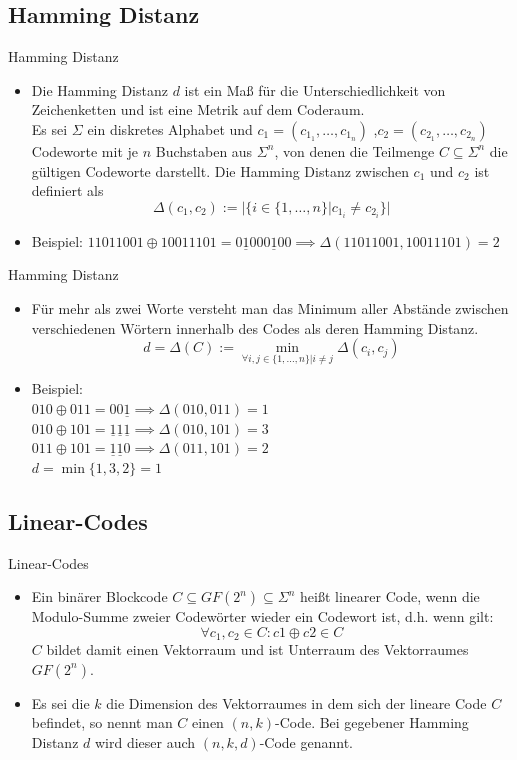 \documentclass[11pt%
,aspectratio=169%
]{beamer}
\begin{document}
\subsection{Hamming Distanz}

\begin{frame}{Hamming Distanz}
	\begin{itemize}
		\item Die Hamming Distanz $d$ ist ein Maß für die Unterschiedlichkeit von Zeichenketten und ist eine Metrik auf dem Coderaum.
		\\Es sei $\Sigma$ ein diskretes Alphabet und $c_1=(c_{1_1},\ldots,c_{1_n})$ ,$c_2=(c_{2_1},\ldots,c_{2_n})$ Codeworte mit je $n$ Buchstaben aus $\Sigma^n$, von denen die Teilmenge  $C\subseteq\Sigma^n$ die gültigen Codeworte darstellt. 
		Die Hamming Distanz zwischen $c_1$ und $c_2$ ist definiert als \[\Delta(c_1,c_2):=|\{i \in \{1,\ldots,n\}| c_{1_i}\neq c_{2_i} \}|\]
		\item Beispiel:
					$ 11011001\oplus 10011101 = 0\underline{1}000\underline{1}00 
					\implies \Delta(11011001,10011101) = 2
					$
	\end{itemize}
\end{frame}

\begin{frame}{Hamming Distanz}
	\begin{itemize}
	
		\item Für mehr als zwei Worte versteht man das Minimum aller Abstände zwischen verschiedenen Wörtern innerhalb des Codes als deren Hamming Distanz.
		\[d=\Delta(C):= \min_{\forall i,j \in \{1,\ldots,n\}|i\neq j}\Delta(c_i,c_j)\]
		\item Beispiel:\\
		$ 010\oplus 011 = 00\underline{1}\implies \Delta(010,011) = 1	$\\$ 010\oplus 101 = \underline{1}\underline{1}\underline{1}\implies \Delta(010,101) = 3$\\ $011\oplus 101 = \underline{1}\underline{1}0
		\implies \Delta(011,101) = 2 $\\$d=\min\{1,3,2\}=1$
	\end{itemize}
\end{frame}

\subsection{Linear-Codes}
\begin{frame}{Linear-Codes}
	\begin{itemize}
		\item Ein binärer Blockcode $C\subseteq GF(2^n) \subseteq \Sigma^n$ heißt linearer Code, wenn die Modulo-Summe zweier Codewörter wieder ein Codewort ist, d.h. wenn gilt:
			\[\forall c_1,c_2 \in C \colon c1\oplus c2 \in C \]
			$C$ bildet damit einen Vektorraum und ist Unterraum des Vektorraumes $GF(2^n)$.
		\item Es sei die $k$ die Dimension des Vektorraumes in dem sich der lineare Code $C$ befindet, so nennt man $C$ einen $(n,k)$-Code. Bei gegebener Hamming Distanz $d$ wird dieser auch $(n,k,d)$-Code genannt. 
	\end{itemize}
\end{frame}
\end{document}
